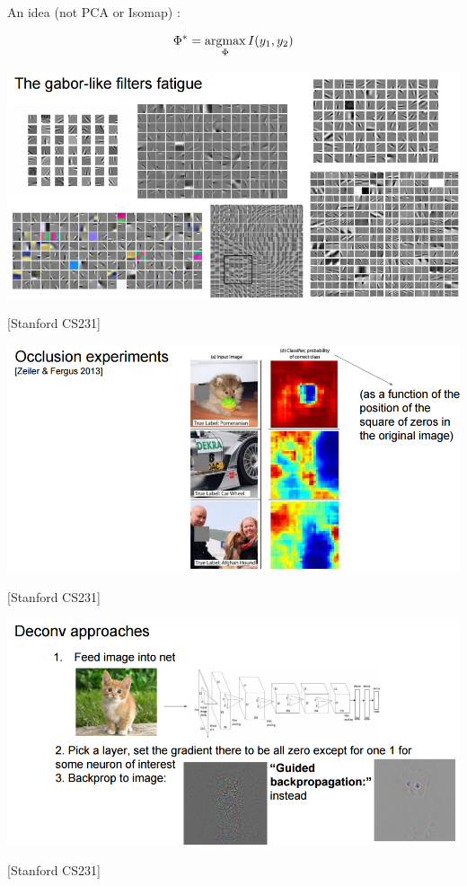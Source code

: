 {\vfill
An idea (not PCA or Isomap) :

\vfill
$$\Phi^* = \operatorname*{argmax}_\Phi I(y_1,y_2)$$

\centerline{\includegraphics[width = 9.5in]{../images/Filters}}
\centerline{[Stanford CS231]}

\slide{}

\centerline{\includegraphics[width = 9.5in]{../images/Occlusion}}
\centerline{[Stanford CS231]}


\centerline{\includegraphics[width = 9.5in]{../images/DeconvAnalysis}}
\centerline{[Stanford CS231]}

}
